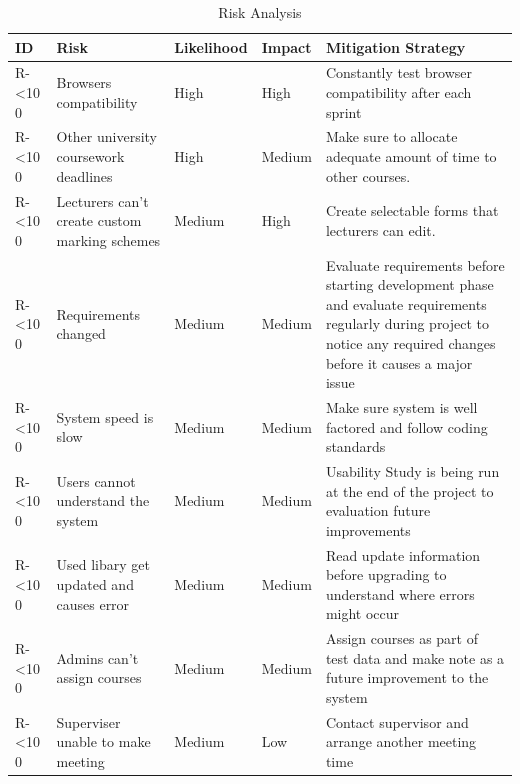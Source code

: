 \documentclass[12pt]{article}  %
\newcommand{\rid}[1]{\centering #1-\ifnum\value{requirement}<10 0\fi\arabic{requirement} \stepcounter{requirement}}
\begin{document}
\begin{spacing}{1.5}
\begin{longtable}{|p{}|p{}|p{}|p{}|p{}|}
\caption{Risk Analysis} \label{table:risks} \\
\hline

\textbf{ID} & \textbf{Risk} & \textbf{Likelihood} & \textbf{Impact } & \textbf{Mitigation Strategy}\\
\hline

\rid{R} & Browsers compatibility & High & High & Constantly test browser compatibility after each sprint\\ \hline

\rid{R} & Other university coursework deadlines & High & Medium & Make sure to allocate adequate amount of time to other courses.\\ \hline



\rid{R} & Lecturers can’t create custom marking schemes & Medium & High & Create selectable forms that lecturers can edit.\\ \hline

\rid{R} & Requirements changed & Medium & Medium & Evaluate requirements before starting development phase and evaluate requirements regularly during project to notice any required changes before it causes a major issue \\ \hline

\rid{R} & System speed is slow & Medium & Medium & Make sure system is well factored and follow coding standards \\ \hline

\rid{R} & Users cannot understand the system & Medium & Medium & Usability Study is being run at the end of the project to evaluation future improvements\\ \hline

\rid{R} & Used libary get updated and causes error & Medium & Medium & Read update information before upgrading to understand where errors might occur\\ \hline

\rid{R} & Admins can’t assign courses & Medium & Medium & Assign courses as part of test data and make note as a future improvement to the system  \\ \hline

\rid{R} & Superviser unable to make meeting & Medium & Low & Contact supervisor and arrange another meeting time \\ \hline


\end{longtable}
\end{spacing}
\end{document}
